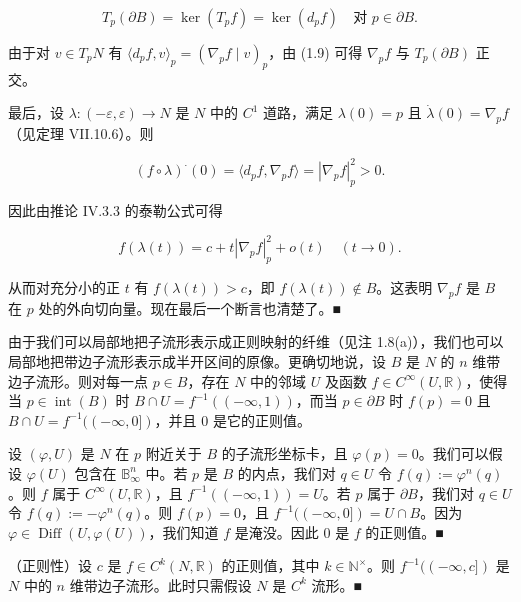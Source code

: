 \begin{theorem}
\begin{equation}
T_{p}(\partial B) = \ker(T_{p}f) = \ker(d_{p}f) \quad \text{对 } p \in \partial B.\tag{1.9}
\end{equation}

由于对 $ v \in T_{p}N $ 有 $ \langle d_{p}f, v \rangle_{p} = (\nabla_{p}f \mid v)_{p} $，由 (1.9) 可得 $ \nabla_{p}f $ 与 $ T_{p}(\partial B) $ 正交。

最后，设 $ \lambda: (-\varepsilon, \varepsilon) \to N $ 是 $ N $ 中的 $ C^{1} $ 道路，满足 $ \lambda(0) = p $ 且 $ \dot{\lambda}(0) = \nabla_{p}f $（见定理 VII.10.6）。则

\[
(f \circ \lambda)^{\cdot}(0) = \langle d_{p}f, \nabla_{p}f \rangle = |\nabla_{p}f|_{p}^{2} > 0.
\]

因此由推论 IV.3.3 的泰勒公式可得

\[
f(\lambda(t)) = c + t|\nabla_{p}f|_{p}^{2} + o(t) \quad (t \to 0).
\]

从而对充分小的正 $ t $ 有 $ f(\lambda(t)) > c $，即 $ f(\lambda(t)) \notin B $。这表明 $ \nabla_{p}f $ 是 $ B $ 在 $ p $ 处的外向切向量。现在最后一个断言也清楚了。\nobreak\hspace{0.35em}■

\end{theorem}

\begin{remark}

\begin{items}
\item

由于我们可以局部地把子流形表示成正则映射的纤维（见注 1.8(a)），我们也可以局部地把带边子流形表示成半开区间的原像。更确切地说，设 $ B $ 是 $ N $ 的 $ n $ 维带边子流形。则对每一点 $ p \in B $，存在 $ N $ 中的邻域 $ U $ 及函数 $ f \in C^{\infty}(U, \mathbb{R}) $，使得当 $ p \in \operatorname{int}(B) $ 时 $ B \cap U = f^{-1}((-\infty, 1)) $，而当 $ p \in \partial B $ 时 $ f(p) = 0 $ 且 $ B \cap U = f^{-1}((-\infty, 0]) $，并且 $ 0 $ 是它的正则值。

\proofhead
设 $ (\varphi, U) $ 是 $ N $ 在 $ p $ 附近关于 $ B $ 的子流形坐标卡，且 $ \varphi(p) = 0 $。我们可以假设 $ \varphi(U) $ 包含在 $ \mathbb{B}_{\infty}^{n} $ 中。若 $ p $ 是 $ B $ 的内点，我们对 $ q \in U $ 令 $ f(q) := \varphi^{n}(q) $。则 $ f $ 属于 $ C^{\infty}(U, \mathbb{R}) $，且 $ f^{-1}((-\infty, 1)) = U $。若 $ p $ 属于 $ \partial B $，我们对 $ q \in U $ 令 $ f(q) := -\varphi^{n}(q) $。则 $ f(p) = 0 $，且 $ f^{-1}((-\infty, 0]) = U \cap B $。因为 $ \varphi \in \operatorname{Diff}(U, \varphi(U)) $，我们知道 $ f $ 是淹没。因此 $ 0 $ 是 $ f $ 的正则值。\nobreak\hspace{0.35em}■
\item

（正则性）设 $ c $ 是 $ f \in C^{k}(N, \mathbb{R}) $ 的正则值，其中 $ k \in \mathbb{N}^{\times} $。则 $ f^{-1}((-\infty, c]) $ 是 $ N $ 中的 $ n $ 维带边子流形。此时只需假设 $ N $ 是 $ C^{k} $ 流形。\nobreak\hspace{0.35em}■

\end{items}

\end{remark}

